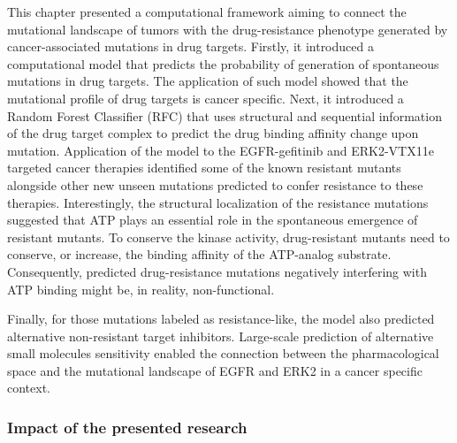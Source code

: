 \documentclass[11pt, b5paper,twoside]{tesi_upf}
\begin{document}
\par This chapter presented a computational framework aiming to connect the mutational landscape of tumors with the drug-resistance phenotype generated by cancer-associated mutations in drug targets. Firstly, it introduced a computational model that predicts the probability of generation of spontaneous mutations in drug targets. The application of such model showed that the mutational profile of drug targets is cancer specific. Next, it introduced a Random Forest Classifier (RFC) that uses structural and sequential information of the drug target complex to predict the drug binding affinity change upon mutation.  Application of the model to the EGFR-gefitinib and ERK2-VTX11e targeted cancer therapies identified some of the known resistant mutants alongside other new unseen mutations predicted to confer resistance to these therapies. Interestingly, the structural localization of the resistance mutations suggested that ATP plays an essential role in the spontaneous emergence of resistant mutants. To conserve the kinase activity, drug-resistant mutants need to conserve, or increase, the binding affinity of the ATP-analog substrate. Consequently, predicted drug-resistance mutations negatively interfering with ATP binding might be, in reality, non-functional.  
\par Finally, for those mutations labeled as resistance-like, the model also predicted alternative non-resistant target inhibitors. Large-scale prediction of alternative small molecules sensitivity enabled the connection between the pharmacological space and the mutational landscape of EGFR and ERK2 in a cancer specific context.

\subsubsection{Impact of the presented research}
 
\end{document}

